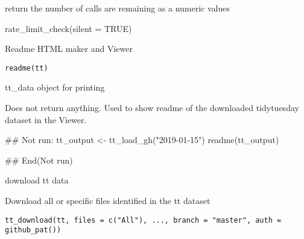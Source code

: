 \documentclass[letterpaper]{book}
\begin{document}
%
\begin{Value}
return the number of calls are remaining as a numeric values
\end{Value}
%
\begin{Examples}
\begin{ExampleCode}

rate_limit_check(silent = TRUE)

\end{ExampleCode}
\end{Examples}
%
\begin{Description}\relax
Readme HTML maker and Viewer
\end{Description}
%
\begin{Usage}
\begin{verbatim}
readme(tt)
\end{verbatim}
\end{Usage}
%
\begin{Arguments}
\begin{ldescription}
\item[\code{tt}] tt\_data object for printing
\end{ldescription}
\end{Arguments}
%
\begin{Value}
Does not return anything. Used to show readme of the downloaded
tidytuesday dataset in the Viewer.
\end{Value}
%
\begin{Examples}
\begin{ExampleCode}
## Not run:
tt_output <- tt_load_gh("2019-01-15")
readme(tt_output)

## End(Not run)
\end{ExampleCode}
\end{Examples}
%
\begin{Description}\relax
download tt data

Download all or specific files identified in the tt dataset
\end{Description}
%
\begin{Usage}
\begin{verbatim}
tt_download(tt, files = c("All"), ..., branch = "master", auth = github_pat())
\end{verbatim}
\end{Usage}
%
\end{document}
